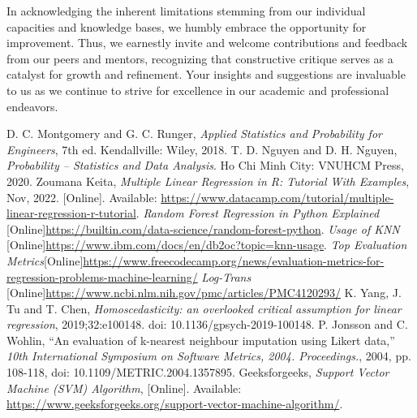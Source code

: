 \documentclass[a4paper]{article}
\theoremstyle{definition}
\begin{document}
In acknowledging the inherent limitations stemming from our individual capacities and knowledge bases, we humbly embrace the opportunity for improvement. Thus, we earnestly invite and welcome contributions and feedback from our peers and mentors, recognizing that constructive critique serves as a catalyst for growth and refinement. Your insights and suggestions are invaluable to us as we continue to strive for excellence in our academic and professional endeavors.
\pagebreak
\begin{thebibliography}{9}
     D. C. Montgomery and G. C. Runger, \emph{Applied Statistics and Probability for Engineers}, 7th ed. Kendallville: Wiley, 2018.
     T. D. Nguyen and D. H. Nguyen, \emph{Probability – Statistics and Data Analysis}. Ho Chi Minh City: VNUHCM Press, 2020.
     Zoumana Keita, \emph{Multiple Linear Regression in R: Tutorial With Examples}, Nov, 2022. [Online]. Available: \href{https://www.datacamp.com/tutorial/multiple-linear-regression-r-tutorial}{https://www.datacamp.com/tutorial/multiple-linear-regression-r-tutorial}.
     \emph{Random Forest Regression in Python Explained } [Online]\href{https://builtin.com/data-science/random-forest-python}{https://builtin.com/data-science/random-forest-python}.
     \emph{Usage of KNN }[Online]\href{https://www.ibm.com/docs/en/db2oc?topic=knn-usage}{https://www.ibm.com/docs/en/db2oc?topic=knn-usage}.
     \emph{Top Evaluation Metrics}[Online]\href{https://www.freecodecamp.org/news/evaluation-metrics-for-regression-problems-machine-learning/}{https://www.freecodecamp.org/news/evaluation-metrics-for-regression-problems-machine-learning/} 
     \emph{Log-Trans}
    [Online]\href{https://www.ncbi.nlm.nih.gov/pmc/articles/PMC4120293/}{https://www.ncbi.nlm.nih.gov/pmc/articles/PMC4120293/}
     K. Yang, J. Tu and T. Chen, \emph{Homoscedasticity: an overlooked critical assumption for linear regression}, 2019;32:e100148. doi: 10.1136/gpsych-2019-100148.
     P. Jonsson and C. Wohlin, “An evaluation of k-nearest neighbour imputation using Likert data,” \emph{10th International Symposium on Software Metrics, 2004. Proceedings.}, 2004, pp. 108-118, doi: 10.1109/METRIC.2004.1357895.
     Geeksforgeeks, \emph{Support Vector Machine (SVM) Algorithm}, [Online]. Available: \href{https://www.geeksforgeeks.org/support-vector-machine-algorithm/}{https://www.geeksforgeeks.org/support-vector-machine-algorithm/}.
    
\end{thebibliography}
\end{document}
